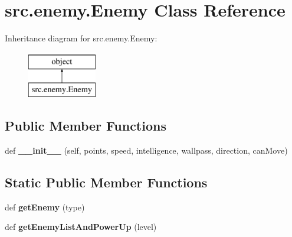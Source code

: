 \hypertarget{classsrc_1_1enemy_1_1_enemy}{}\section{src.\+enemy.\+Enemy Class Reference}
\label{classsrc_1_1enemy_1_1_enemy}
Inheritance diagram for src.\+enemy.\+Enemy\+:\begin{figure}[H]
\begin{center}
\leavevmode
\includegraphics[height=2.000000cm]{classsrc_1_1enemy_1_1_enemy}
\end{center}
\end{figure}
\subsection*{Public Member Functions}
\begin{DoxyCompactItemize}
\item 
\hypertarget{classsrc_1_1enemy_1_1_enemy_a6ec62571df1087a1a7683d62a4434081}{}def {\bfseries \+\_\+\+\_\+init\+\_\+\+\_\+} (self, points, speed, intelligence, wallpass, direction, can\+Move)\label{classsrc_1_1enemy_1_1_enemy_a6ec62571df1087a1a7683d62a4434081}

\end{DoxyCompactItemize}
\subsection*{Static Public Member Functions}
\begin{DoxyCompactItemize}
\item 
\hypertarget{classsrc_1_1enemy_1_1_enemy_a4476f5bc0be70d26bebece6abcb7bdad}{}def {\bfseries get\+Enemy} (type)\label{classsrc_1_1enemy_1_1_enemy_a4476f5bc0be70d26bebece6abcb7bdad}

\item 
\hypertarget{classsrc_1_1enemy_1_1_enemy_a01da6a5d5f8eb5db75323749a80fc3a0}{}def {\bfseries get\+Enemy\+List\+And\+Power\+Up} (level)\label{classsrc_1_1enemy_1_1_enemy_a01da6a5d5f8eb5db75323749a80fc3a0}

\end{DoxyCompactItemize}
